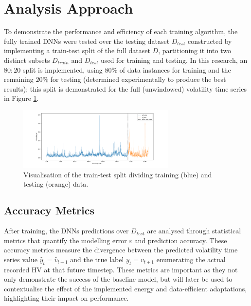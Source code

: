 \documentclass[a4paper, 11pt]{report}
\begin{document}
    \section{Analysis Approach}
    \label{section: metrics}

    To demonstrate the performance and efficiency of each training algorithm, the fully trained DNNs were tested over the testing dataset $D_{test}$ constructed by implementing a train-test split of the full dataset $D$, partitioning it into two distinct subsets $D_{train}$ and $D_{test}$ used for training and testing. In this research, an $80 \colon 20$ split is implemented, using $80\%$ of data instances for training and the remaining $20\%$ for testing (determined experimentally to produce the best results); this split is demonstrated for the full (unwindowed) volatility time series in Figure \ref{fig: traintest-split}.


    \begin{figure}[ht]
        \centering
        \includegraphics[width=0.7\textwidth]{traintest-split.png}
        \caption{\centering Visualisation of the train-test split dividing training (blue) and testing (orange) data.}
        \label{fig: traintest-split}
    \end{figure}


    \subsection{Accuracy Metrics}
    \label{section: accuracy-metrics}

    After training, the DNNs predictions over $D_{test}$ are analysed through statistical metrics that quantify the modelling error $\varepsilon$ and prediction accuracy. These accuracy metrics measure the divergence between the predicted volatility time series value $\hat{y}_t = \hat{v}_{t+1}$ and the true label $y_t = v_{t+1}$ enumerating the actual recorded HV at that future timestep. These metrics are important as they not only demonstrate the success of the baseline model, but will later be used to contextualise the effect of the implemented energy and data-efficient adaptations, highlighting their impact on performance. 
\end{document}
